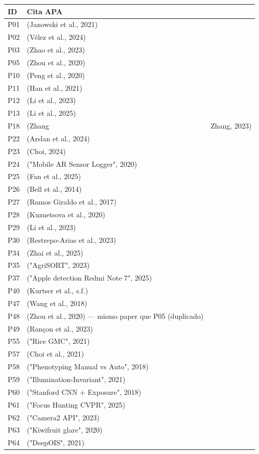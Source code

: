 \begin{tabular}{ll}
\hline
ID & Cita APA \\
\hline
P01 & (Janowski et al., 2021) \\
P02 & (Vélez et al., 2024) \\
P03 & (Zhao et al., 2023) \\
P05 & (Zhou et al., 2020) \\
P10 & (Peng et al., 2020) \\
P11 & (Han et al., 2021) \\
P12 & (Li et al., 2023) \\
P13 & (Li et al., 2025) \\
P18 & (Zhang & Zhang, 2023) \\
P22 & (Arslan et al., 2024) \\
P23 & (Choi, 2024) \\
P24 & ("Mobile AR Sensor Logger", 2020) \\
P25 & (Fan et al., 2025) \\
P26 & (Bell et al., 2014) \\
P27 & (Ramos Giraldo et al., 2017) \\
P28 & (Kuznetsova et al., 2020) \\
P29 & (Li et al., 2023) \\
P30 & (Restrepo-Arias et al., 2023) \\
P34 & (Zhai et al., 2025) \\
P35 & ("AgriSORT", 2023) \\
P37 & ("Apple detection Redmi Note 7", 2025) \\
P40 & (Kurtser et al., s.f.) \\
P47 & (Wang et al., 2018) \\
P48 & (Zhou et al., 2020) — mismo paper que P05 (duplicado) \\
P49 & (Rançon et al., 2023) \\
P55 & ("Rice GMC", 2021) \\
P57 & (Choi et al., 2021) \\
P58 & ("Phenotyping Manual vs Auto", 2018) \\
P59 & ("Illumination-Invariant", 2021) \\
P60 & ("Stanford CNN + Exposure", 2018) \\
P61 & ("Focus Hunting CVPR", 2025) \\
P62 & ("Camera2 API", 2023) \\
P63 & ("Kiwifruit glare", 2020) \\
P64 & ("DeepOIS", 2021) \\

\end{tabular}
